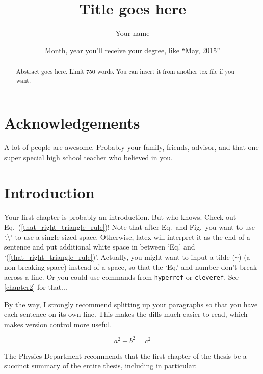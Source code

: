 \documentclass[letterpaper,12pt]{yalephd}
\title{Title goes here}
\author{Your name}
\date{Month, year you'll receive your degree, like ``May, 2015''} %
\begin{document}
\frontmatter

\begin{abstract}
Abstract goes here. Limit 750 words. You can insert it from another tex file if you want.
\end{abstract}

\maketitle
\makecopyright{\printyear} %
\tableofcontents
\listoffigures %
\listoftables %


\chapter{Acknowledgements} %
A lot of people are awesome. Probably your family, friends, 
advisor, and that one super special high school teacher who
believed in you.

\mainmatter

\chapter{Introduction} \label{chapter1}
Your first chapter is probably an introduction. But who knows. Check out Eq.\ (\ref{that_right_triangle_rule})!
Note that after Eq.\ and Fig.\ you want to use `.\textbackslash'  to use a single sized space. Otherwise,
latex will interpret it as the end of a sentence and put additional white space in between `Eq.' and 
`(\ref{that_right_triangle_rule})'.
Actually, you might want to input a tilde (\texttt{\~}) (a non-breaking space) instead of a space, so that the `Eq.' and number don't break across a line.
Or you could use commands from \texttt{hyperref} or \texttt{cleveref}.
See \cref{chapter2} for that...

By the way, I strongly recommend splitting up your paragraphs so that you have each sentence on its own line.
This makes the diffs much easier to read, which makes version control more useful.

\begin{equation}
a^2 + b^2 = c^2 \label{that_right_triangle_rule}
\end{equation}

The Physics Department recommends that the first chapter of the thesis be 
a succinct summary of the entire thesis, including in particular:
\end{document}
